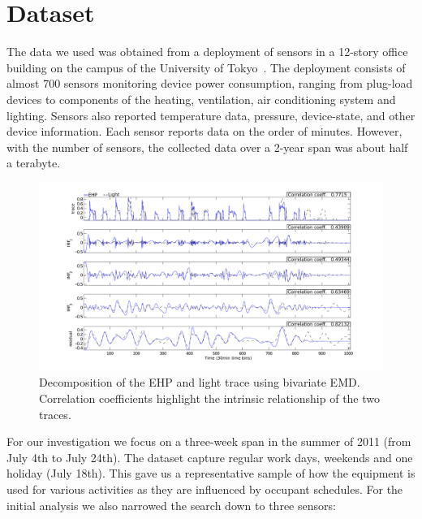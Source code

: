 \section{Dataset}
The data we used was obtained from a deployment of sensors in a 12-story office building
on the campus of the University of Tokyo~\cite{gutp, ogawa:lncs2011}.  The deployment consists of 
almost 700 sensors monitoring device power consumption, ranging from plug-load devices to components of the
heating, ventilation, air conditioning system and lighting.  Sensors also reported temperature
data, pressure, device-state, and other device information.  Each sensor reports data on the
order of minutes.  However, with the number of sensors, the collected data over a 2-year
span was about half a terabyte.


\begin{figure}[tb]
\hspace{-2cm}
\includegraphics[width=1.2\textwidth]{img/emd_25_26-eps-converted-to}
\vspace{-1cm}
\caption{Decomposition of the EHP and light trace using bivariate EMD. Correlation coefficients highlight the intrinsic relationship of the two traces.}
\label{fig:emd}
\end{figure}



For our investigation we focus on a three-week span in the summer of 2011 (from July 4th to July 24th).
The dataset capture regular work days, weekends and one holiday (July 18th).  This gave us a representative sample
of how the equipment is used for various activities as they are influenced by occupant schedules.  For the initial
analysis we also narrowed the search down to three sensors:

